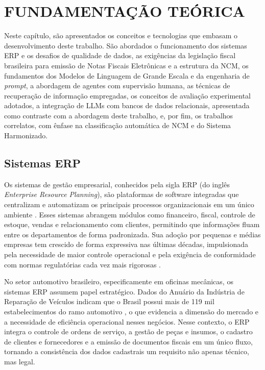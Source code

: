 \chapter{FUNDAMENTAÇÃO TEÓRICA}
\label{cap:fundamentacao}

Neste capítulo, são apresentados os conceitos e tecnologias que embasam o desenvolvimento deste trabalho. São abordados o funcionamento dos sistemas ERP e os desafios de qualidade de dados, as exigências da legislação fiscal brasileira para emissão de Notas Fiscais Eletrônicas e a estrutura da NCM, os fundamentos dos Modelos de Linguagem de Grande Escala e da engenharia de \textit{prompt}, a abordagem de agentes com supervisão humana, as técnicas de recuperação de informação empregadas, os conceitos de avaliação experimental adotados, a integração de LLMs com bancos de dados relacionais, apresentada como contraste com a abordagem deste trabalho, e, por fim, os trabalhos correlatos, com ênfase na classificação automática de NCM e do Sistema Harmonizado.

\section{Sistemas ERP}

Os sistemas de gestão empresarial, conhecidos pela sigla ERP (do inglês \textit{Enterprise Resource Planning}), são plataformas de software integradas que centralizam e automatizam os principais processos organizacionais em um único ambiente \cite{arora2017}. Esses sistemas abrangem módulos como financeiro, fiscal, controle de estoque, vendas e relacionamento com clientes, permitindo que informações fluam entre os departamentos de forma padronizada. Sua adoção por pequenas e médias empresas tem crescido de forma expressiva nas últimas décadas, impulsionada pela necessidade de maior controle operacional e pela exigência de conformidade com normas regulatórias cada vez mais rigorosas \cite{laukkanen2007erp,vanEverdingen2000erp}.

No setor automotivo brasileiro, especificamente em oficinas mecânicas, os sistemas ERP assumem papel estratégico. Dados do Anuário da Indústria de Reparação de Veículos indicam que o Brasil possui mais de 119 mil estabelecimentos do ramo automotivo \cite{sindirepa2023}, o que evidencia a dimensão do mercado e a necessidade de eficiência operacional nesses negócios. Nesse contexto, o ERP integra o controle de ordens de serviço, a gestão de peças e insumos, o cadastro de clientes e fornecedores e a emissão de documentos fiscais em um único fluxo, tornando a consistência dos dados cadastrais um requisito não apenas técnico, mas legal.


